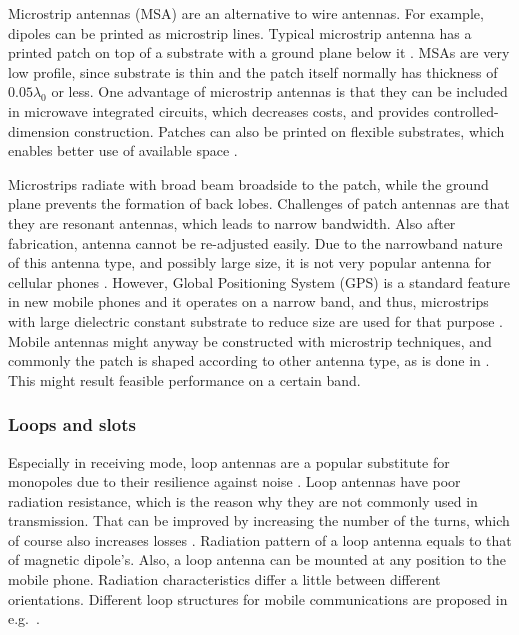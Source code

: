 Microstrip antennas (MSA) are an alternative to wire antennas. For example, dipoles can be printed as microstrip lines. Typical microstrip antenna has a printed patch on top of a substrate with a ground plane below it \cite{stutzman}. MSAs are very low profile, since substrate is thin and the patch itself normally has thickness of $0.05\lambda_0$ or less. One advantage of microstrip antennas is that they can be included in microwave integrated circuits, which decreases costs, and provides controlled-dimension construction. Patches can also be printed on flexible substrates, which enables better use of available space \cite{stutzman}.

Microstrips radiate with broad beam broadside to the patch, while the ground plane prevents the formation of back lobes. Challenges of patch antennas are that they are resonant antennas, which leads to narrow bandwidth. Also after fabrication, antenna cannot be re-adjusted easily. Due to the narrowband nature of this antenna type, and possibly large size, it is not very popular antenna for cellular phones \cite{stutzman}. However, Global Positioning System (GPS) is a standard feature in new mobile phones and it operates on a narrow band, and thus, microstrips with large dielectric constant substrate to reduce size are used for that purpose \cite{stutzman}. Mobile antennas might anyway be constructed with microstrip techniques, and commonly the patch is shaped according to other antenna type, as is done in \cite{microstrip_example1,microstrip_example2}. This might result feasible performance on a certain band.

\subsubsection{Loops and slots}
\label{sec:loop}
Especially in receiving mode, loop antennas are a popular substitute for monopoles due to their resilience against noise \cite{balanis}. Loop antennas have poor radiation resistance, which is the reason why they are not commonly used in transmission. That can be improved by increasing the number of the turns, which of course also increases losses \cite{stutzman}. Radiation pattern of a loop antenna equals to that of magnetic dipole's.  Also, a loop antenna can be mounted at any position to the mobile phone. Radiation characteristics differ a little between different orientations. Different loop structures for mobile communications are proposed in e.g.\ \cite{loop_example1,loop_example2,loop_example3}.

